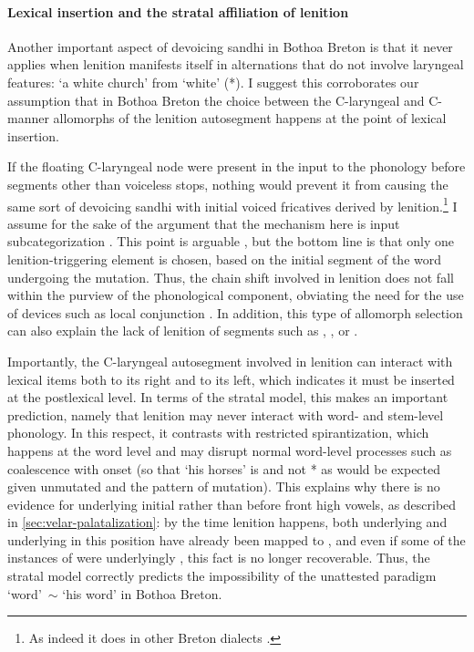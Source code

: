 \paragraph{Lexical insertion and the stratal affiliation of lenition}
\label{sec:lexic-insert-strat}

Another important aspect of devoicing sandhi in Bothoa Breton is that it never applies when lenition manifests itself in alternations that do not involve laryngeal features:  `a white church' from \ipa{[ˈdʒɥɛn]} `white' (*). I suggest this corroborates our assumption that in Bothoa Breton the choice between the C-laryngeal and C-manner allomorphs of the lenition autosegment happens at the point of lexical insertion.

If the floating C-laryngeal node were present in the input to the phonology before segments other than voiceless stops, nothing  would prevent it from causing the same sort of devoicing sandhi with initial voiced fricatives derived by lenition.\footnote{As indeed it does in other Breton dialects \citep{falchun38:_recher,falchun,histbreton}.} I assume for the sake of the argument that the mechanism here is input subcategorization \citep{paster06:_phonol,bye-allomorphy,yu07}. This point is arguable \citep[\egm][]{wolf08:_optim_inter}, but the bottom line is that only one lenition-triggering element is chosen, based on the initial segment of the word undergoing the mutation. Thus, the chain shift involved in lenition does not fall within the purview of the phonological component, obviating the need for the use of devices such as local conjunction \citep{kirchner-lc}. In addition, this type of allomorph selection can also explain the lack of lenition of segments such as \ipa{[d]}, \ipa{[dʒ]}, or \ipa{[n]}.

Importantly, the C-laryngeal autosegment involved in lenition can interact with lexical items both to its right and to its left, which indicates it must be inserted at the postlexical level. In terms of the stratal model, this makes an important prediction, namely that lenition may never interact with word- and stem\hyp level phonology. In this respect, it contrasts with restricted spirantization, which happens at the word level and may disrupt normal word-level processes such as coalescence with onset \ipa{[i]} (so that `his horses' is \ipa{[i ˈhjɛzəɡ̊]} and not *\ipa{[i ˈhɛzəɡ̊]} as would be expected given unmutated \ipa{[ʧɛzəɡ̊]} and the  pattern of mutation). This explains why there is no evidence for underlying initial \ipa{[ɡ]} rather than \ipa{[dʒ]} before front high vowels, as described in \cref{sec:velar-palatalization}: by the time lenition happens, both underlying  and underlying  in this position have already been mapped to \ipa{[dʒ]}, and even if some of the instances of \ipa{[dʒ]} were underlyingly , this fact is no longer recoverable. Thus, the stratal model correctly predicts the impossibility of the unattested paradigm \ipa{[ˈdʒiːr]} `word'~$\sim$ \ipa{[i hiːr]} `his word' in Bothoa Breton.

